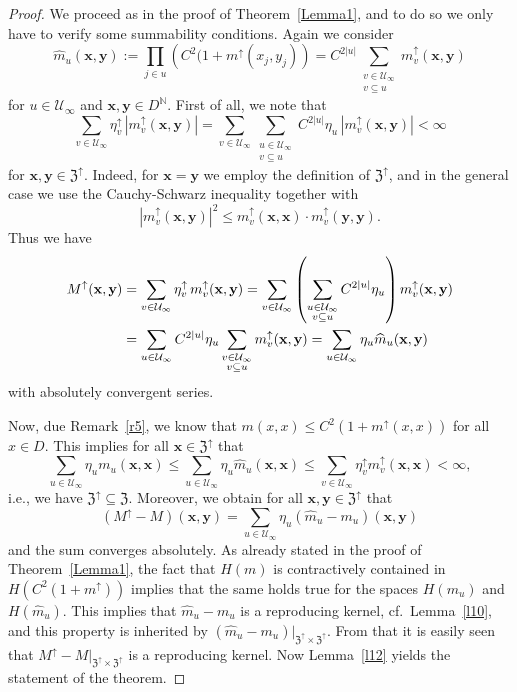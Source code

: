 \documentclass{article}
\newcommand{\N}  {{\mathbb N}}
\newcommand{\bx}{{\mathbf x}}
\newcommand{\by}{{\mathbf y}}
\newcommand{\Z}{{\mathfrak Z}}
\newcommand{\U}  {\mathcal{U}}
\newcommand{\up}{\uparrow}
\theoremstyle{plain}
\theoremstyle{definition}
\begin{document}
\begin{proof}
We proceed as in the proof of Theorem~\ref{Lemma1}, and to do so
we only have to verify some summability conditions.
Again we consider
\[
\widehat{m}_u(\bx,\by) := 
\prod_{j\in u} \left(C^2(1+m^{\up}(x_j,y_j)\right)
= C^{2|u|} \sum_{\substack{v \in \U_\infty \\ v \subseteq u}}
m^{\up}_{v}(\bx,\by)
\]
for $u \in \U_\infty$ and $\bx,\by \in D^\N$.
First of all, we note that
\[
\sum_{v\in \U_\infty} \eta_v^{\up} \, |m^{\up}_{v} (\bx,\by)| =
\sum_{v\in \U_\infty} 
\sum_{\substack{u \in \U_\infty\\  v \subseteq u }}
C^{2 |u|}\eta_u \, |m^{\up}_{v} (\bx,\by)| < \infty
\]
for $\bx,\by \in \Z^{\up}$. Indeed, for $\bx=\by$ we employ the
definition of $\Z^\up$, and in the general case we use
the Cauchy-Schwarz inequality together with
\[
|m^{\up}_{v} (\bx,\by)|^2 \leq
m^{\up}_{v} (\bx,\bx) \cdot
m^{\up}_{v} (\by,\by).
\] 
Thus we have 
\begin{align}\label{eq:for_next_remark}
M^{\up} (\bx,\by) 
&= \sum_{v\in \U_\infty} \eta_v^{\up} \, m^{\up}_{v} (\bx,\by) 
=\sum_{v\in \U_\infty} \left( 
\sum_{\substack{u \in \U_\infty\\  v \subseteq u }}
C^{2 |u|}\eta_u \right) m^{\up}_{v} (\bx,\by)  \notag \\
&=\sum_{u\in \U_\infty}C^{2\left|u\right|}\eta_u
\sum_{\substack{v \in \U_\infty \\ v\subseteq u}} m^{\up}_{v}(\bx,\by) 
= \sum_{u\in \U_\infty} \eta_u \widehat{m}_u (\bx,\by)
\end{align}
with absolutely convergent series.

Now, due Remark~\ref{r5},  
we know that  
$m(x,x) \le C^2 (1+ m^{\up}(x,x))$ 
for all $x\in D$. This implies for all $\bx \in \Z^{\up}$ that
\[
\sum_{u\in \U_\infty} \eta_u m_u  (\bx, \bx)
\le \sum_{u\in \U_\infty} \eta_u \widehat{m}_u  (\bx, \bx)
\le \sum_{v\in \U_\infty} \eta_v^{\up} m_v^{\up}  (\bx, \bx)
< \infty,
\]
i.e., we have $\Z^{\up} \subseteq \Z$.
Moreover, we obtain for all $\bx, \by \in \Z^{\up}$ that
\[
\left( M^{\up} - M \right) (\bx, \by) =
\sum_{u\in \U_\infty} \eta_u \left(\widehat{m}_u - m_u \right) (\bx, \by)
\]
and the sum converges absolutely. 
As already stated in the proof of Theorem~\ref{Lemma1}, 
the fact that $H(m)$ is contractively contained in 
$H(C^2(1+m^{\up}))$ implies that 
the same holds true for the spaces 
$H(m_{u})$ and $H(\widehat{m}_u)$.
This implies that $\widehat{m}_u - m_u$ is a reproducing kernel, 
cf.\ Lemma~\ref{l10}, and this property is inherited by 
$\left( \widehat{m}_u - m_u \right)|_{\Z^{\up}\times \Z^{\up}}$.
From that it is easily seen that 
$M^{\up} - M|_{\Z^{\up}\times \Z^{\up}}$ is a reproducing kernel. 
Now Lemma~\ref{l12} yields the statement of the theorem. 
\end{proof}
\end{document}
